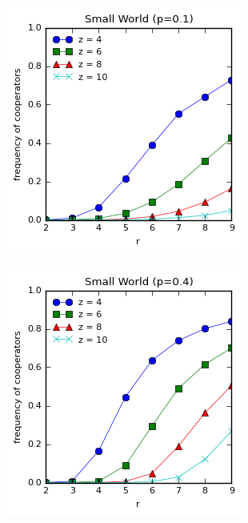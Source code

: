 \documentclass{article}
\begin{document}
    \begin{figure}[h]
		\centering
		\begin{subfigure}[b]{0.4\textwidth}
			\includegraphics[width=\textwidth]{fig/fixed/sw01.png}
			\caption{}
		\end{subfigure}
		\begin{subfigure}[b]{0.4\textwidth}
			\includegraphics[width=\textwidth]{fig/fixed/sw04.png}

\end{subfigure}
\end{figure}
\end{document}
